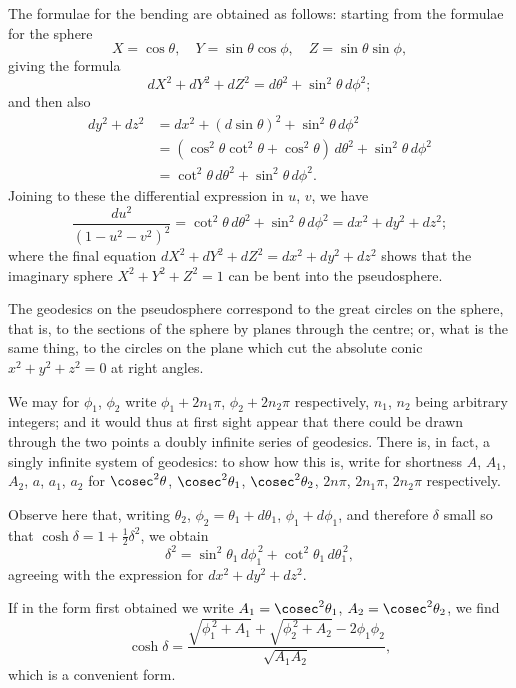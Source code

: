\documentclass[11pt,a4paper]{book}
\begin{document}
\begin{art}
The formulae for the bending are obtained as follows: starting from the formulae for the sphere
\[
X = \cos\theta, \quad Y = \sin\theta\cos\phi, \quad Z = \sin\theta\sin\phi,
\]
giving the formula
\[
dX^2 + dY^2 + dZ^2 = d\theta^2 + \sin^2\theta\,d\phi^2;
\]
and then also
\begin{align*}
dy^2 + dz^2 &= dx^2 + (d\sin\theta)^2 + \sin^2\theta\,d\phi^2 \\
&= (\cos^2\theta \cot^2\theta + \cos^2\theta)\,d\theta^2 + \sin^2\theta\,d\phi^2 \\
&= \cot^2\theta\,d\theta^2 + \sin^2\theta\,d\phi^2.
\end{align*}
Joining to these the differential expression in $u$, $v$, we have
\[
\frac{du^2}{(1-u^2-v^2)^2} = \cot^2\theta\,d\theta^2 + \sin^2\theta\,d\phi^2 = dx^2 + dy^2 + dz^2;
\]
where the final equation $dX^2 + dY^2 + dZ^2 = dx^2 + dy^2 + dz^2$ shows that the imaginary sphere $X^2 + Y^2 + Z^2 = 1$ can be bent into the pseudosphere.
\end{art}

\begin{art}
The geodesics on the pseudosphere correspond to the great circles on the sphere, that is, to the sections of the sphere by planes through the centre; or, what is the same thing, to the circles on the plane which cut the absolute conic $x^2+y^2+z^2 = 0$ at right angles.
\end{art}

\begin{art}
We may for $\phi_1$, $\phi_2$ write $\phi_1 + 2n_1\pi$, $\phi_2 + 2n_2\pi$ respectively, $n_1$, $n_2$ being arbitrary integers; and it would thus at first sight appear that there could be drawn through the two points a doubly infinite series of geodesics. There is, in fact, a singly infinite system of geodesics: to show how this is, write for shortness $A$, $A_1$, $A_2$, $a$, $a_1$, $a_2$ for $\cosec^2\theta$, $\cosec^2\theta_1$, $\cosec^2\theta_2$, $2n\pi$, $2n_1\pi$, $2n_2\pi$ respectively.
\end{art}

\begin{art}
Observe here that, writing $\theta_2$, $\phi_2 = \theta_1 + d\theta_1$, $\phi_1 + d\phi_1$, and therefore $\delta$ small so that $\cosh\delta = 1 + \frac{1}{2}\delta^2$, we obtain
\[
\delta^2 = \sin^2\theta_1\,d\phi_1^{\,2} + \cot^2\theta_1\,d\theta_1^{\,2},
\]
agreeing with the expression for $dx^2 + dy^2 + dz^2$.

If in the form first obtained we write $A_1 = \cosec^2\theta_1$, $A_2 = \cosec^2\theta_2$, we find
\[
\cosh\delta = \frac{\sqrt{\phi_1^{\,2} + A_1} + \sqrt{\phi_2^{\,2} + A_2} - 2\phi_1\phi_2}{\sqrt{A_1A_2}},
\]
which is a convenient form.
\end{art}
\end{document}
